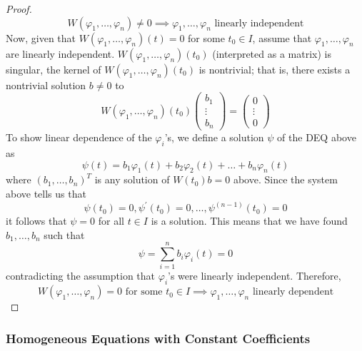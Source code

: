 \documentclass{article}
\begin{document}
\begin{proof}
    \begin{equation}
      W(\varphi_1, \ldots, \varphi_n) \neq 0 \implies \varphi_1, \ldots, \varphi_n \text{ linearly independent}
    \end{equation}
    Now, given that $W(\varphi_1, \ldots, \varphi_n) (t) = 0$ for some $t_0 \in I$, assume that $\varphi_1, \ldots, \varphi_n$ are linearly independent. $W(\varphi_1, \ldots, \varphi_n)(t_0)$ (interpreted as a matrix) is singular, the kernel of $W(\varphi_1, \ldots, \varphi_n)(t_0)$ is nontrivial; that is, there exists a nontrivial solution $b \neq 0$ to 
    \begin{equation}
      W(\varphi_1, \ldots, \varphi_n)(t_0) \begin{pmatrix}
          b_1 \\ \vdots \\ b_n \end{pmatrix}= \begin{pmatrix}
          0 \\ \vdots \\ 0 \end{pmatrix}
    \end{equation}
    To show linear dependence of the $\varphi_i$'s, we define a solution $\psi$ of the DEQ above as
    \begin{equation}
      \psi (t) = b_1 \varphi_1 (t) + b_2 \varphi_2 (t) + \ldots + b_n \varphi_n (t)
    \end{equation}
    where $(b_1, \ldots, b_n)^T$ is any solution of $W(t_0) b = 0$ above. Since the system above tells us that
    \begin{equation}
      \psi(t_0) = 0, \psi^\prime (t_0) = 0, \ldots, \psi^{(n-1)} (t_0) = 0
    \end{equation}
    it follows that $\psi= 0$ for all $t \in I$ is a solution. This means that we have found $b_1, \ldots, b_n$ such that 
    \begin{equation}
      \psi = \sum_{i=1}^n b_i \varphi_i (t) = 0
    \end{equation}
    contradicting the assumption that $\varphi_i$'s were linearly independent. Therefore, 
    \begin{equation}
      W(\varphi_1, \ldots, \varphi_n) = 0 \text{ for some } t_0 \in I \implies \varphi_1, \ldots, \varphi_n \text{ linearly dependent}
    \end{equation}
    \end{proof}

    \subsubsection{Homogeneous Equations with Constant Coefficients}
\end{document}
